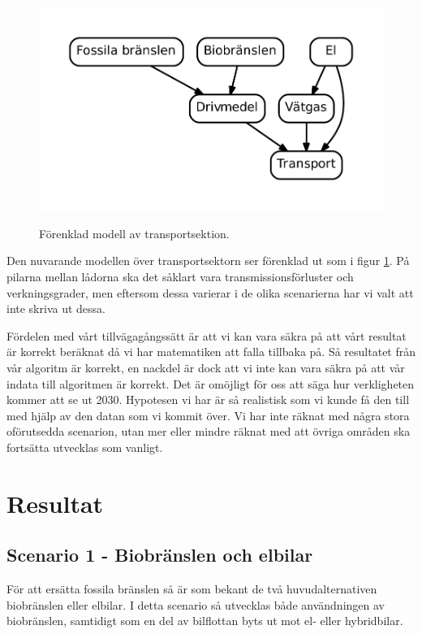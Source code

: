 \documentclass[a4paper,11pt,fleqn, titlepage]{article}
\begin{document}
\begin{figure}[h!]
	\centering
	\includegraphics[scale=0.70]{diagram.pdf}
	\label{modell}
	\caption{Förenklad modell av transportsektion.}
\end{figure}

Den nuvarande modellen över transportsektorn ser förenklad ut som i figur
\ref{modell}. På pilarna mellan lådorna ska det såklart vara
transmissionsförluster och verkningsgrader, men eftersom dessa varierar i
de olika scenarierna har vi valt att inte skriva ut dessa.

Fördelen med vårt tillvägagångssätt är att vi kan vara säkra på att vårt
resultat är korrekt beräknat då vi har matematiken att falla tillbaka på.
Så resultatet från vår algoritm är korrekt, en nackdel är dock att vi inte
kan vara säkra på att vår indata till algoritmen är korrekt. Det är
omöjligt för oss att säga hur verkligheten kommer att se ut 2030. Hypotesen
vi har är så realistisk som vi kunde få den till med hjälp av den datan som
vi kommit över. Vi har inte räknat med några stora oförutsedda scenarion,
utan mer eller mindre räknat med att övriga områden ska fortsätta utvecklas
som vanligt.


\section{Resultat}

\subsection{Scenario 1 - Biobränslen och elbilar}

För att ersätta fossila bränslen så är som bekant de två huvudalternativen
biobränslen eller elbilar. I detta scenario så utvecklas både användningen
av biobränslen, samtidigt som en del av bilflottan byts ut mot el- eller
hybridbilar.
\end{document}
